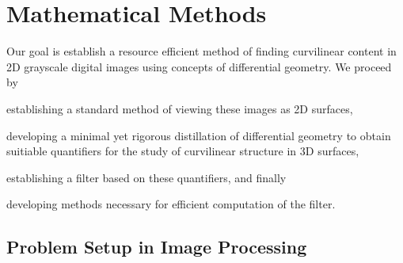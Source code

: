 \chapter{Mathematical Methods}

%
%
%
%
% 
%
%
%


Our goal is establish a resource efficient method of finding curvilinear content in 2D grayscale digital images using concepts of differential geometry. We proceed by
\begin{enumerate*}[label=(\roman*)]
	\item establishing a standard method of viewing these images as 2D surfaces,
	\item developing a minimal yet rigorous distillation of differential geometry
			to obtain suitiable quantifiers
			for the study of curvilinear structure in 3D surfaces,
	\item establishing a filter based on these quantifiers,
	and finally
	\item developing methods necessary for efficient computation of the filter.
\end{enumerate*}

\section{Problem Setup in Image Processing}\label{sec:image-processing-setup}

